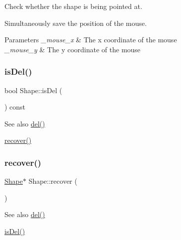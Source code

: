 Check whether the shape is being pointed at. 

Simultaneously save the position of the mouse. 
\begin{DoxyParams}{Parameters}
{\em \+\_\+mouse\+\_\+x} & The x coordinate of the mouse \\
\hline
{\em \+\_\+mouse\+\_\+y} & The y coordinate of the mouse \\
\hline
\end{DoxyParams}
\mbox{\label{class_shape_ab93f2288cad70553ecdaf61ae9b17533}} 
\subsubsection{\texorpdfstring{is\+Del()}{isDel()}}
{\footnotesize\ttfamily bool Shape\+::is\+Del (\begin{DoxyParamCaption}{ }\end{DoxyParamCaption}) const\hspace{0.3cm}{\ttfamily [inline]}}

\begin{DoxySeeAlso}{See also}
\mbox{\hyperlink{class_shape_a592b3cd82e09faba98018ff8498dd411}{del()}} 

\mbox{\hyperlink{class_shape_aba906e02eb04a0b82caab679715204a7}{recover()}} 
\end{DoxySeeAlso}
\mbox{\label{class_shape_aba906e02eb04a0b82caab679715204a7}} 
\subsubsection{\texorpdfstring{recover()}{recover()}}
{\footnotesize\ttfamily \mbox{\hyperlink{class_shape}{Shape}}$\ast$ Shape\+::recover (\begin{DoxyParamCaption}{ }\end{DoxyParamCaption})\hspace{0.3cm}{\ttfamily [inline]}}

\begin{DoxySeeAlso}{See also}
\mbox{\hyperlink{class_shape_a592b3cd82e09faba98018ff8498dd411}{del()}} 

\mbox{\hyperlink{class_shape_ab93f2288cad70553ecdaf61ae9b17533}{is\+Del()}} 
\end{DoxySeeAlso}
\mbox{\label{class_shape_af3b265335667167ced81b3226b07dcb0}} 
